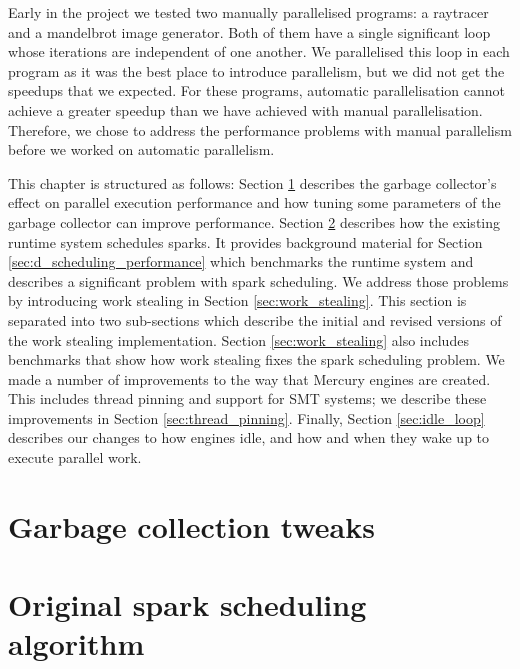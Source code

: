 

Early in the project
we tested two manually parallelised programs:
a raytracer and a mandelbrot image generator.
Both of them have a single significant loop
whose iterations are independent of one another.
We parallelised this loop in each program as it was the best place to
introduce parallelism,
but we did not get the speedups that we expected.
For these programs, automatic parallelisation cannot achieve
a greater speedup than we have achieved with manual parallelisation.
Therefore,
we chose to address the performance problems with manual parallelism
before we worked on automatic parallelism.

This chapter is structured as follows:
Section \ref{sec:gc} describes the garbage collector's effect on parallel
execution performance and how tuning some parameters of the garbage
collector can improve performance.
Section \ref{sec:original_scheduling} describes how the existing runtime
system schedules sparks.
It provides background material for Section
\ref{sec:d_scheduling_performance}
which benchmarks the runtime system and describes a significant problem with
spark scheduling.
We address those problems by introducing work stealing in Section
\ref{sec:work_stealing}.
This section is separated into two sub-sections
which describe the initial and revised versions of the work stealing
implementation.
Section \ref{sec:work_stealing} also includes benchmarks that show
how work stealing fixes the spark scheduling problem.
We made a number of improvements to the way that Mercury engines are created.
This includes thread pinning and support for SMT systems;
we describe these improvements in Section \ref{sec:thread_pinning}.
Finally, Section \ref{sec:idle_loop} describes our changes to how engines
idle,
and how and when they wake up to execute parallel work.

\section{Garbage collection tweaks}
\label{sec:gc}




\section{Original spark scheduling algorithm}
\label{sec:original_scheduling}


